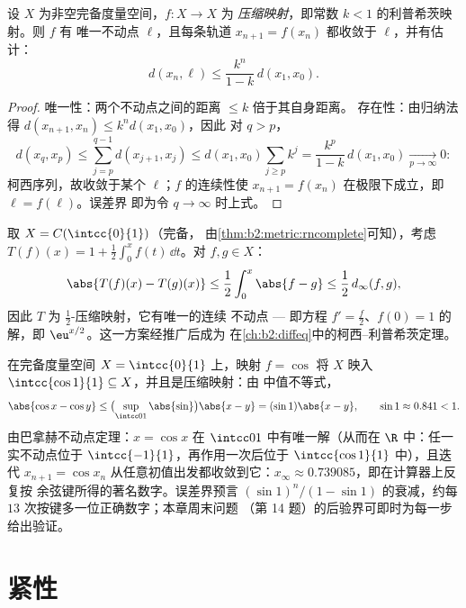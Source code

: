\begin{theorem}[巴拿赫不动点定理]\label{thm:b2:metric:banach}
设 $X$ 为非空完备度量空间，$f \colon X \to X$ 为
\emph{压缩映射}，即常数 $k < 1$ 的利普希茨映射。则 $f$ 有
唯一不动点 $\ell$，且每条轨道 $x_{n+1} = f(x_n)$
都收敛于 $\ell$，并有估计：
\[
d(x_n, \ell) \leq \frac{k^n}{1 - k}\, d(x_1, x_0) .
\]
\end{theorem}

\begin{proof}
唯一性：两个不动点之间的距离 $\leq k$ 倍于其自身距离。
存在性：由归纳法得 $d(x_{n+1}, x_n) \leq k^n d(x_1, x_0)$，因此
对 $q > p$，
\[
d(x_q, x_p) \leq \sum_{j=p}^{q-1} d(x_{j+1}, x_j)
\leq d(x_1, x_0) \sum_{j \geq p} k^j
= \frac{k^p}{1-k}\, d(x_1, x_0) \xrightarrow[p\to\infty]{} 0 :
\]
柯西序列，故收敛于某个 $\ell$；$f$ 的连续性使
$x_{n+1} = f(x_n)$ 在极限下成立，即 $\ell = f(\ell)$。误差界
即为令 $q \to \infty$ 时上式。
\end{proof}

\begin{example}[一个积分方程]\label{ex:b2:metric:integralequation}
取 $X = C(\intcc{0}{1})$（完备，
由\cref{thm:b2:metric:rncomplete}可知），考虑 $T(f)(x) = 1 + \frac12
\int_0^x f(t)\,\dd t$。对 $f, g \in X$：
\[
\abs{T(f)(x) - T(g)(x)} \leq \frac12 \int_0^x \abs{f - g} \leq
\frac12\, d_\infty(f, g),
\]
因此 $T$ 为 $\frac12$-压缩映射，它有唯一的连续
不动点 --- 即方程 $f' = \frac f2$、$f(0) = 1$ 的解，即
$\eu^{x/2}$。这一方案经推广后成为
在\cref{ch:b2:diffeq}中的柯西--利普希茨定理。
\end{example}

\begin{example}[数值不动点：$x = \cos x$]\label{ex:b2:metric:cosfix}
在完备度量空间 $X = \intcc{0}{1}$ 上，映射 $f = \cos$ 将 $X$
映入 $\intcc{\cos 1}{1} \subseteq X$，并且是压缩映射：由
中值不等式，
\[
\abs{\cos x - \cos y} \leq \bigl(\sup_{\intcc01}\abs{\sin}\bigr)
\abs{x - y} = (\sin 1)\abs{x - y},
\qquad \sin 1 \approx 0.841 < 1 .
\]
由巴拿赫不动点定理：$x = \cos x$ 在 $\intcc01$ 中有唯一解（从而在
$\R$ 中：任一实不动点位于 $\intcc{-1}{1}$，再作用一次后位于
$\intcc{\cos 1}{1}$ 中），且迭代
$x_{n+1} = \cos x_n$ 从任意初值出发都收敛到它：$x_\infty
\approx 0.739085$，即在计算器上反复按
余弦键所得的著名数字。误差界预言
$(\sin1)^n/(1 - \sin1)$ 的衰减，约每
$13$ 次按键多一位正确数字；本章周末问题
（第 14 题）的后验界可即时为每一步给出验证。
\end{example}

\section{紧性}

